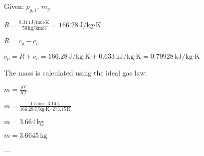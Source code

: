 Given: \( p_{g,1} \), \( m_g \)  

\( R = \frac{8.314 \, \text{J/mol·K}}{50 \, \text{kg/kmol}} = 166.28 \, \text{J/kg·K} \)  

\( R = c_p - c_v \)  

\( c_p = R + c_v = 166.28 \, \text{J/kg·K} + 0.633 \, \text{kJ/kg·K} = 0.79928 \, \text{kJ/kg·K} \)  

The mass is calculated using the ideal gas law:  

\( m = \frac{\rho V}{R T} \)  

\( m = \frac{1.5 \, \text{bar} \cdot 3.14 \, \text{L}}{166.28 \, \text{J/kg·K} \cdot 273.15 \, \text{K}} \)  

\( m = 3.664 \, \text{kg} \)  

\( m = 3.6645 \, \text{kg} \)  

---